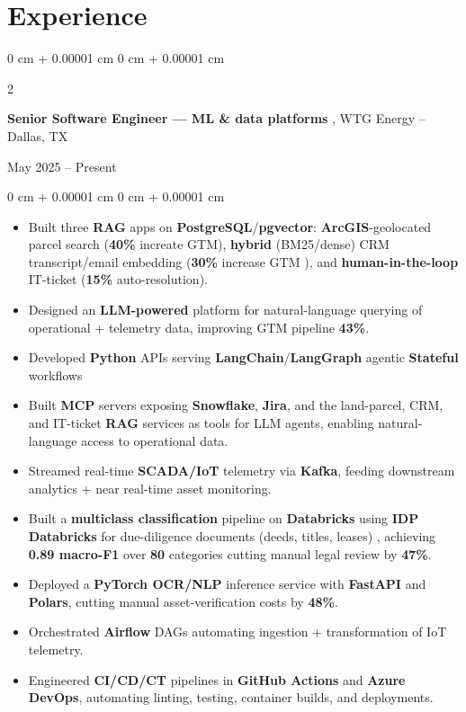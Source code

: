 \documentclass[10pt, letterpaper]{article}
\newenvironment{highlights}{
    \begin{itemize}[
        topsep=0.10 cm,
        parsep=0.10 cm,
        partopsep=0pt,
        itemsep=0pt,
        leftmargin=0 cm + 10pt
    ]
}{
    \end{itemize}
} %
\newenvironment{onecolentry}{
    \begin{adjustwidth}{
        0 cm + 0.00001 cm
    }{
        0 cm + 0.00001 cm
    }
}{
    \end{adjustwidth}
} %
\newenvironment{twocolentry}[2][]{
    \onecolentry
    \def\secondColumn{#2}
    \setcolumnwidth{\fill, 3.4 cm}
    \begin{paracol}{2}
}{
    \switchcolumn \raggedleft \secondColumn
    \end{paracol}
    \endonecolentry
} %
\begin{document}
    \section{Experience}
        \begin{twocolentry}{
            May 2025 -- Present
        }
\textbf{Senior Software Engineer — ML \& data platforms }, WTG Energy -- Dallas, TX
\end{twocolentry}
\begin{onecolentry}
\begin{highlights}
    \item Built three \textbf{RAG} apps on \textbf{PostgreSQL}/\textbf{pgvector}: \textbf{ArcGIS}-geolocated parcel search (\textbf{40\%} increate GTM), \textbf{hybrid} (BM25/dense) CRM transcript/email embedding (\textbf{30\%} increase GTM ), and  \textbf{human-in-the-loop} IT-ticket (\textbf{15\%} auto-resolution).
    \item Designed an \textbf{LLM-powered} platform for natural-language querying of operational + telemetry data, improving GTM pipeline \textbf{43\%}.
    \item Developed \textbf{Python} APIs serving \textbf{LangChain}/\textbf{LangGraph} agentic \textbf{Stateful} workflows 
    \item Built \textbf{MCP} servers exposing \textbf{Snowflake}, \textbf{Jira}, and the land-parcel, CRM, and IT-ticket \textbf{RAG} services as tools for LLM agents, enabling natural-language access to operational data.
    \item Streamed real-time \textbf{SCADA/IoT} telemetry via \textbf{Kafka}, feeding downstream analytics + near real-time asset monitoring.
    \item Built a \textbf{multiclass classification} pipeline on \textbf{Databricks} using \textbf{IDP Databricks} for due-diligence documents (deeds, titles, leases) , achieving \textbf{0.89 macro-F1} over \textbf{80} categories cutting manual legal review by \textbf{47\%}.
    
    \item Deployed a \textbf{PyTorch OCR/NLP} inference service with \textbf{FastAPI} and \textbf{Polars}, cutting manual asset-verification costs by \textbf{48\%}.
    \item Orchestrated \textbf{Airflow} DAGs automating ingestion + transformation of IoT telemetry.
    \item Engineered \textbf{CI/CD/CT} pipelines in \textbf{GitHub Actions} and \textbf{Azure DevOps}, automating linting, testing, container builds, and deployments.
\end{highlights}
\end{onecolentry}
\end{document}

